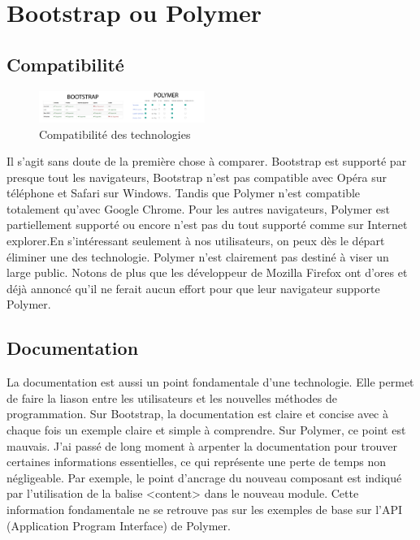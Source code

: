 \documentclass{article}
\begin{document}
\newpage
\section{Bootstrap ou Polymer}

\subsection{Compatibilit\'e}

\begin{figure}
  \vspace{-25pt}
  \begin{center}
    \includegraphics[width=0.48\textwidth]{p14}
  \end{center}
  \vspace{-20pt}
  \caption{Compatibilit\'e des technologies}
  \vspace{-10pt}
\end{figure}

Il s'agit sans doute de la premi\`ere chose \`a comparer. Bootstrap est support\'e par presque tout les navigateurs, Bootstrap n'est pas compatible avec Op\'era sur t\'el\'ephone et Safari sur Windows. Tandis que Polymer n'est compatible totalement qu'avec Google Chrome. Pour les autres navigateurs, Polymer est partiellement support\'e ou encore n'est pas du tout support\'e comme sur Internet explorer.En s'int\'eressant seulement \`a nos utilisateurs, on peux d\`es le d\'epart \'eliminer une des technologie. Polymer n'est clairement pas destin\'e \`a viser un large public. Notons de plus que les d\'eveloppeur de Mozilla Firefox ont d'ores et d\'ej\`a annonc\'e qu'il ne ferait aucun effort pour que leur navigateur supporte Polymer.\\

\subsection{Documentation}

La documentation est aussi un point fondamentale d'une technologie. Elle permet de faire la liason entre les utilisateurs et les nouvelles m\'ethodes de programmation. Sur Bootstrap, la documentation est claire et concise avec \`a chaque fois un exemple claire et simple \`a comprendre. Sur Polymer, ce point est mauvais. J'ai pass\'e de long moment \`a arpenter la documentation pour trouver certaines informations essentielles, ce qui repr\'esente une perte de temps non n\'egligeable. Par exemple, le point d'ancrage du nouveau composant est indiqu\'e par l'utilisation de la balise <content> dans le nouveau module. Cette information fondamentale ne se retrouve pas sur les exemples de base sur l'API (Application Program Interface) de Polymer.
\end{document}
